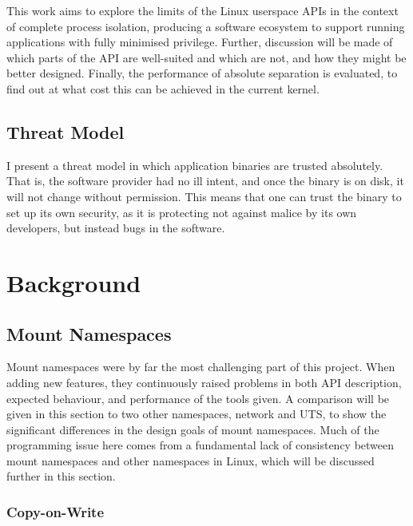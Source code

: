 \documentclass[sigplan]{acmart}
\begin{document}
This work aims to explore the limits of the Linux userspace APIs in the context of complete process isolation, producing a software ecosystem to support running applications with fully minimised privilege. Further, discussion will be made of which parts of the API are well-suited and which are not, and how they might be better designed. Finally, the performance of absolute separation is evaluated, to find out at what cost this can be achieved in the current kernel.

\subsection{Threat Model}
\label{section:threat-model}

I present a threat model in which application binaries are trusted absolutely. That is, the software provider had no ill intent, and once the binary is on disk, it will not change without permission. This means that one can trust the binary to set up its own security, as it is protecting not against malice by its own developers, but instead bugs in the software.


\section{Background}

\subsection{Mount Namespaces}

Mount namespaces were by far the most challenging part of this project. When adding new features, they continuously raised problems in both API description, expected behaviour, and performance of the tools given. A comparison will be given in this section to two other namespaces, network and UTS, to show the significant differences in the design goals of mount namespaces. Much of the programming issue here comes from a fundamental lack of consistency between mount namespaces and other namespaces in Linux, which will be discussed further in this section.

\subsubsection{Copy-on-Write}
\end{document}
